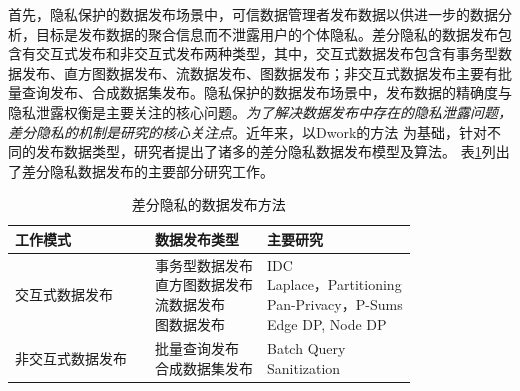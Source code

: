 首先，隐私保护的数据发布场景中，可信数据管理者发布数据以供进一步的数据分析\cite{aggarwal2008privacy}，目标是发布数据的聚合信息而不泄露用户的个体隐私。差分隐私的数据发布包含有交互式发布和非交互式发布两种类型，其中，交互式数据发布包含有事务型数据发布、直方图数据发布、流数据发布、图数据发布；非交互式数据发布主要有批量查询发布、合成数据集发布\cite{zhu2017differentially}。隐私保护的数据发布场景中，发布数据的精确度与隐私泄露权衡是主要关注的核心问题。{\em 为了解决数据发布中存在的隐私泄露问题，差分隐私的机制是研究的核心关注点}。近年来，以Dwork的方法
\cite{dwork2006calibrating}为基础，针对不同的发布数据类型，研究者提出了诸多的差分隐私数据发布模型及算法。
表\ref{tab:survey_dp_publishing}列出了差分隐私数据发布的主要部分研究工作。

\begin{table}[htbp]
\caption{差分隐私的数据发布方法}
\label{tab:survey_dp_publishing}
\centering
\fontsize{10pt}{\baselineskip}\selectfont
\begin{tabular}{p{}p{}p{}p{}}
\toprule
	\textbf{工作模式}& &\textbf{数据发布类型}&\textbf{主要研究}\\
	\midrule
   交互式数据发布& &\makecell[l]{事务型数据发布 \\ 直方图数据发布 \\ 流数据发布\\ 图数据发布} &\makecell[l]{
IDC\cite{gupta2012iterative}\\Laplace\cite{dwork2006calibrating}，Partitioning\cite{chen2011publishing}\\ Pan-Privacy\cite{dwork2010differential}，P-Sums\cite{chan2011private}\\ Edge DP\cite{zhang2015private}, Node DP\cite{kasiviswanathan2013analyzing}} \\
   \midrule
非交互式数据发布& &\makecell[l]{批量查询发布\\ 合成数据集发布} & \makecell[l]{Batch Query\cite{yuan2012low}\\ Sanitization\cite{dwork2009on}}\\

  \bottomrule
\end{tabular}
\end{table}

